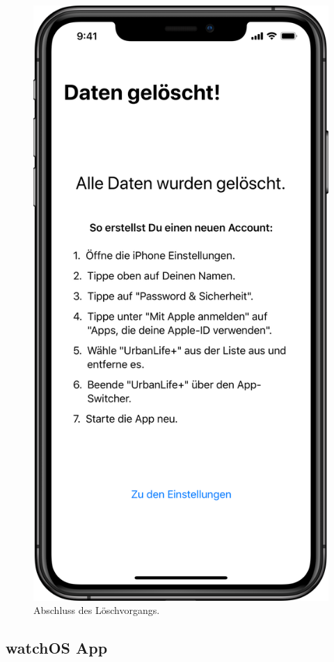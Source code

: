 \begin{minipage}{.45\textwidth}
	\begin{figure}[H]
		\centering
		\includegraphics[width=.68\textwidth]{./images/prototype/ios/nuked.png}
		\caption{\label{fig:app:ios:nuked}Abschluss des Löschvorgangs.}
	\end{figure}
\end{minipage}

\subsection{watchOS App}

